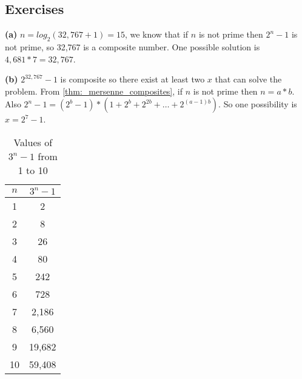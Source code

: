 \subsection{Exercises}


\sol \textbf{(a)} $n = log_2(32,767+1) = 15$, we know that if $n$ is not prime then $2^n - 1$ is not prime, so 32,767 is a composite number. 
One possible solution is $4,681 * 7 = 32,767$.

\sol \textbf{(b)} $2^{32,767} - 1$ is composite so there exist at least two $x$ that can solve the problem.
From \ref{thm:_mersenne_composites}, if $n$ is not prime then $n = a*b$.
Also $2^n - 1 = (2^b - 1) * (1 + 2^b + 2^{2b} + \ldots + 2^{(a-1)b})$.
So one possibility is $x = 2^7 - 1$.


\sol \begin{table}[h]
  \centering
  \label{tab:3n_minus_1}
  \begin{tabular}{|c|c|}
    \hline
    $n$ & $3^n - 1$\\
    \hline
    1 & 2\\
    2 & 8\\
    3 & 26\\
    4 & 80\\
    5 & 242\\
    6 & 728\\
    7 & 2,186\\
    8 & 6,560\\
    9 & 19,682\\
    10 & 59,408\\
    \hline
  \end{tabular}
  \caption{Values of $3^n - 1$ from 1 to 10}
\end{table}



